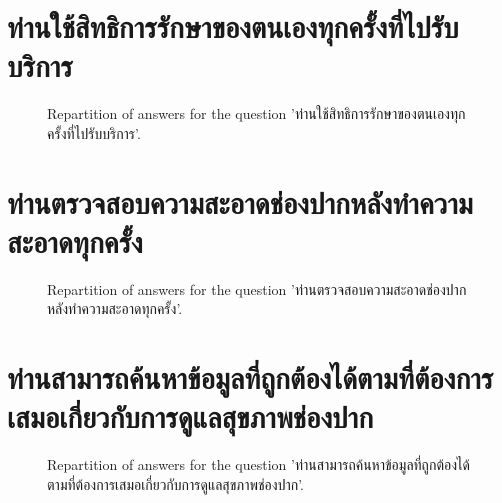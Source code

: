 \documentclass[12pt]{article}
\begin{document}
\clearpage{}
\section{ท่านใช้สิทธิการรักษาของตนเองทุกครั้งที่ไปรับบริการ}

\label{sec:102}


\begin{figure}[h!]
    \caption{\label{figure:q102-1}Repartition of answers for the question 'ท่านใช้สิทธิการรักษาของตนเองทุกครั้งที่ไปรับบริการ'.}
\end{figure}



\clearpage{}
\section{ท่านตรวจสอบความสะอาดช่องปากหลังทำความสะอาดทุกครั้ง}

\label{sec:103}


\begin{figure}[h!]
    \caption{\label{figure:q103-1}Repartition of answers for the question 'ท่านตรวจสอบความสะอาดช่องปากหลังทำความสะอาดทุกครั้ง'.}
\end{figure}



\clearpage{}
\section{ท่านสามารถค้นหาข้อมูลที่ถูกต้องได้ตามที่ต้องการเสมอเกี่ยวกับการดูแลสุขภาพช่องปาก}

\label{sec:104}


\begin{figure}[h!]
    \caption{\label{figure:q104-1}Repartition of answers for the question 'ท่านสามารถค้นหาข้อมูลที่ถูกต้องได้ตามที่ต้องการเสมอเกี่ยวกับการดูแลสุขภาพช่องปาก'.}
\end{figure}
\end{document}
